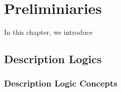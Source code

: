 
\chapter{Preliminiaries}
\label{cha:preliminiaries}

In this chapter, we introduce 


\section{Description Logics}
\label{sec:description-logics}

\subsection{Description Logic Concepts}
\label{sec:dl-concepts}








